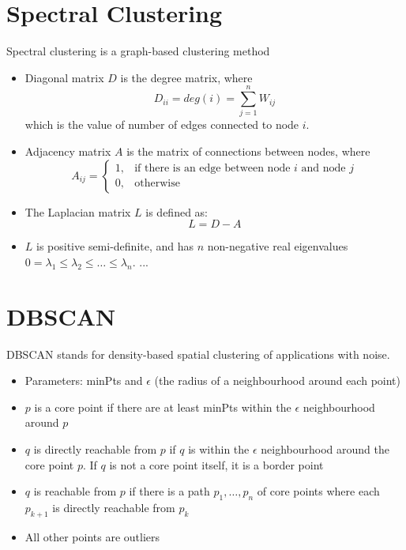 \documentclass[12pt,a4paper]{article}
\begin{document}
\section{Spectral Clustering}
Spectral clustering is a graph-based clustering method
\begin{itemize}
    \item Diagonal matrix $D$ is the degree matrix, where 
    $$
    D_{i i} = deg(i) = \sum_{j=1}^n W_{i j}
    $$
    which is the value of number of edges connected to node $i$.
    \item Adjacency matrix $A$ is the matrix of connections between nodes, where
    $$
    A_{i j} = \begin{cases} 1, & \text{if there is an edge between node $i$ and node $j$} \\ 0, & \text{otherwise} \end{cases}
    $$
    \item The Laplacian matrix $L$ is defined as:
    $$
    L = D - A
    $$
    \item $L$ is positive semi-definite, and has $n$ non-negative real eigenvalues $0 = \lambda_1 \leq \lambda_2 \leq \ldots \leq \lambda_n$.  
    ...
\end{itemize}

\section{DBSCAN}
DBSCAN stands for density-based spatial clustering of applications with noise. 
\begin{itemize}
    \item Parameters: minPts and $\epsilon$ (the radius of a neighbourhood around each point)
    \item $p$ is a core point if there are at least minPts within the $\epsilon$ neighbourhood around $p$
    \item $q$ is directly reachable from $p$ if $q$ is within the $\epsilon$ neighbourhood around the core point $p$. If $q$ is not a core point itself, it is a border point
    \item $q$ is reachable from $p$ if there is a path $p_1, \ldots, p_n$ of core points where each $p_{k+1}$ is directly reachable from $p_k$
    \item All other points are outliers
\end{itemize}
\end{document}
